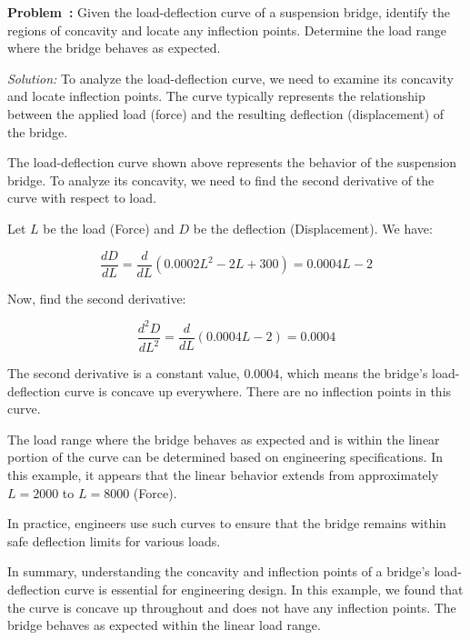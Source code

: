 \documentclass[a4paper,12pt]{book}
\newcounter{problem}
\newenvironment{problem}[1][\theproblem]
{\refstepcounter{problem}\par\medskip\noindent\textbf{Problem~#1:} \rmfamily}{\medskip}
\newenvironment{solution}[1][]
{\par\noindent\textit{Solution:} \rmfamily}{\medskip}
\newcounter{example}
\begin{document}
\begin{problem}
Given the load-deflection curve of a suspension bridge, identify the regions of concavity and locate any inflection points. Determine the load range where the bridge behaves as expected.
\end{problem}

\begin{solution}
To analyze the load-deflection curve, we need to examine its concavity and locate inflection points. The curve typically represents the relationship between the applied load (force) and the resulting deflection (displacement) of the bridge.

\begin{center}
\end{center}

The load-deflection curve shown above represents the behavior of the suspension bridge. To analyze its concavity, we need to find the second derivative of the curve with respect to load.

Let \(L\) be the load (Force) and \(D\) be the deflection (Displacement). We have:

\[
\frac{dD}{dL} = \frac{d}{dL}(0.0002L^2 - 2L + 300) = 0.0004L - 2
\]

Now, find the second derivative:

\[
\frac{d^2D}{dL^2} = \frac{d}{dL}(0.0004L - 2) = 0.0004
\]

The second derivative is a constant value, \(0.0004\), which means the bridge's load-deflection curve is concave up everywhere. There are no inflection points in this curve.

The load range where the bridge behaves as expected and is within the linear portion of the curve can be determined based on engineering specifications. In this example, it appears that the linear behavior extends from approximately \(L = 2000\) to \(L = 8000\) (Force).

In practice, engineers use such curves to ensure that the bridge remains within safe deflection limits for various loads.

In summary, understanding the concavity and inflection points of a bridge's load-deflection curve is essential for engineering design. In this example, we found that the curve is concave up throughout and does not have any inflection points. The bridge behaves as expected within the linear load range.
\end{solution}
\end{document}
